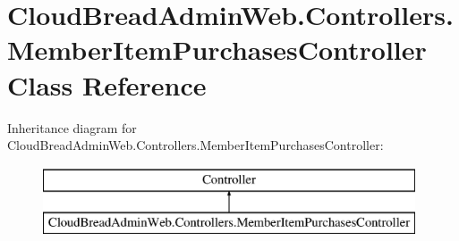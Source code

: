 \hypertarget{class_cloud_bread_admin_web_1_1_controllers_1_1_member_item_purchases_controller}{}\section{Cloud\+Bread\+Admin\+Web.\+Controllers.\+Member\+Item\+Purchases\+Controller Class Reference}
\label{class_cloud_bread_admin_web_1_1_controllers_1_1_member_item_purchases_controller}
Inheritance diagram for Cloud\+Bread\+Admin\+Web.\+Controllers.\+Member\+Item\+Purchases\+Controller\+:\begin{figure}[H]
\begin{center}
\leavevmode
\includegraphics[height=2.000000cm]{class_cloud_bread_admin_web_1_1_controllers_1_1_member_item_purchases_controller}
\end{center}
\end{figure}
